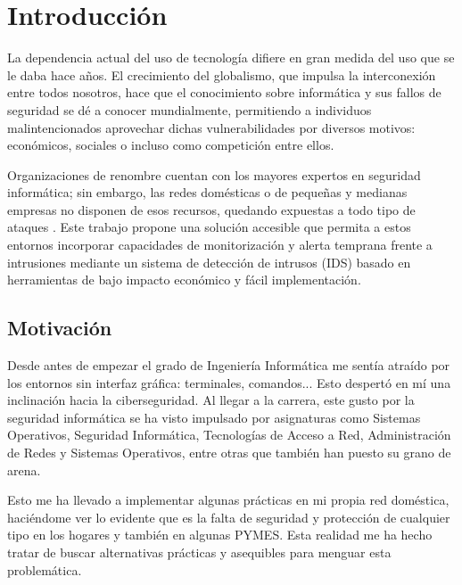 \documentclass[11pt,a4paper,twoside]{report}
\begin{document}

\chapter*{Introducción}
\setcounter{secnumdepth}{0} %
La dependencia actual del uso de tecnología difiere en gran medida del uso que se le daba hace años. El crecimiento del globalismo, que impulsa la interconexión entre todos nosotros, hace que el conocimiento sobre informática y sus fallos de seguridad se dé a conocer mundialmente, permitiendo a individuos malintencionados aprovechar dichas vulnerabilidades por diversos motivos: económicos, sociales o incluso como competición entre ellos.\newline

Organizaciones de renombre cuentan con los mayores expertos en seguridad informática; sin embargo, las redes domésticas o de pequeñas y medianas empresas no disponen de esos recursos, quedando expuestas a todo tipo de ataques \cite{enisa_smes}. Este trabajo propone una solución accesible que permita a estos entornos incorporar capacidades de monitorización y alerta temprana frente a intrusiones mediante un sistema de detección de intrusos (IDS) basado en herramientas de bajo impacto económico y fácil implementación.

\section{Motivación}
Desde antes de empezar el grado de Ingeniería Informática me sentía atraído por los entornos sin interfaz gráfica: terminales, comandos... Esto despertó en mí una inclinación hacia la ciberseguridad. Al llegar a la carrera, este gusto por la seguridad informática se ha visto impulsado por asignaturas como Sistemas Operativos, Seguridad Informática, Tecnologías de Acceso a Red, Administración de Redes y Sistemas Operativos, entre otras que también han puesto su grano de arena.\newline

Esto me ha llevado a implementar algunas prácticas en mi propia red doméstica, haciéndome ver lo evidente que es la falta de seguridad y protección de cualquier tipo en los hogares y también en algunas PYMES. Esta realidad me ha hecho tratar de buscar alternativas prácticas y asequibles para menguar esta problemática.\newline
\end{document}

